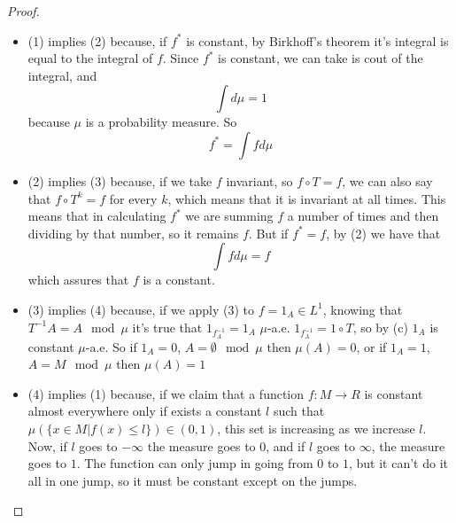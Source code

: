 \begin{proof}
	\begin{itemize}
		\item (1) implies (2) because, if $f^*$ is constant, by Birkhoff's theorem it's integral is equal to the integral of $f$. Since $f^*$ is constant, we can take is cout of the integral, and 
			$$
				\int d\mu = 1
			$$
			because $\mu$ is a probability measure. So
			$$
				f^* = \int f d\mu
			$$
		\item (2) implies (3) because, if we take $f$ invariant, so $f\circ T = f$, we can also say that $f\circ T^k = f$ for every $k$, which means that it is invariant at all times. This means that in calculating $f^*$ we are summing $f$ a number of times and then dividing by that number, so it remains $f$. But if $f^* = f$, by (2) we have that
			$$
				\int f d\mu = f
			$$
			which assures that $f$ is a constant.
		\item (3) implies (4) because, if we apply (3) to $f=1_A \in L^1$, knowing that $T^{-1}A=A \mod\mu$ it's true that $1_{f^{-1}_A}=1_A$ $\mu$-a.e.
			$1_{f^{-1}_A} = 1 \circ T$, so by (c) $1_A$ is constant $\mu$-a.e.
			So if $1_A = 0$, $A=\emptyset\mod\mu$ then $\mu(A)=0$, or if $1_A=1$, $A=M\mod\mu$ then $\mu(A)=1$
		\item (4) implies (1) because, if we claim that a function $f:M \rightarrow R$ is constant almost everywhere only if exists a constant $l$ such that $\mu(\{x\in M | f(x) \leq l\})\in (0,1)$, this set is increasing as we increase $l$. Now, if $l$ goes to $-\infty$ the measure goes to $0$, and if $l$ goes to $\infty$, the measure goes to $1$. The function can only jump in going from $0$ to $1$, but it can't do it all in one jump, so it must be constant except on the jumps.
	\end{itemize}	
\end{proof}














